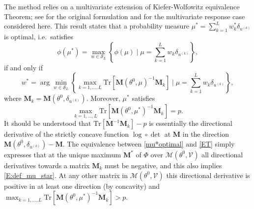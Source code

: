\documentclass[a4paper]{article}
\newcommand{\Luc}{\color{magenta} }
\theoremstyle{definition}
\theoremstyle{remark}
\newcommand{\Tr}{\mathrm{Tr}}
\newcommand{\V}{\mathcal{V}}
\newcommand{\Mb}{\mathbf{M}}
\renewcommand{\S}{\mathcal{S}}
\begin{document}
The method relies on a multivariate extension of Kiefer-Wolfowitz equivalence Theorem; see \cite{KieferW60} for the original formulation and \cite{HarmanT2009} for the multivariate response case considered here. 
This result states that a probability measure $\mu^*=\sum_{k=1}^L w_k^*\delta_{u^{(k)}}$ is optimal, i.e.\ satisfies 
\begin{equation}\label{mu*optimal}
\phi(\mu^*)=\max_{w\in \S_L}
\left\{ \phi(\mu) \mid \mu=\sum_{k=1}^L w_k\delta_{u^{(k)}}\right\},
\end{equation}
if and only if 
\begin{equation}\label{ET}
w^*=\arg\min_{w\in \S_L}
\left\{
\max_{k=1,\dots ,L} 
\Tr
\left[
\Mb(\theta^0,\mu)^{-1}
\Mb_k
\right]
\mid 
\mu=\sum_{k=1}^L w_k\delta_{u^{(k)}}
\right\},
\end{equation}
where  $\Mb_k=\Mb(\theta^0,\delta_{u^{(k)}})$. Moreover, $\mu^*$ satisfies 
\begin{equation}\label{E:def_mu_star}
\max_{k=1,\dots ,L} 
\Tr
\left[
\Mb(\theta^0,\mu^*)^{-1}
\Mb_k
\right]=p.
\end{equation}
%
It should be understood that 
$
\Tr
\left[
\Mb^{-1}
\Mb_k
\right]- p$ is essentially the directional derivative of the strictly concave function $\log \circ \det$ at $\Mb$ in the direction $\Mb(\theta^0,\delta_{u^{(k)}})-\Mb$.
{\Luc The equivalence between \eqref{mu*optimal} and \eqref{ET} simply expresses that at
the unique maximum $\Mb^*$ of $\Phi$ over $\mathcal{M}(\theta^0, \V)$ all directional derivatives towards a matrix $\Mb_k$ must be negative, and this also implies 
\eqref{E:def_mu_star}. At any other matrix in $\mathcal{M}(\theta^0, \V)$ this directional derivative is positive in at least one direction (by concavity) and $\max_{k=1,\dots, L} 
\Tr
\left[
\Mb(\theta^0,\mu^*)^{-1}
\Mb_k
\right]>p$.  }
\end{document}
